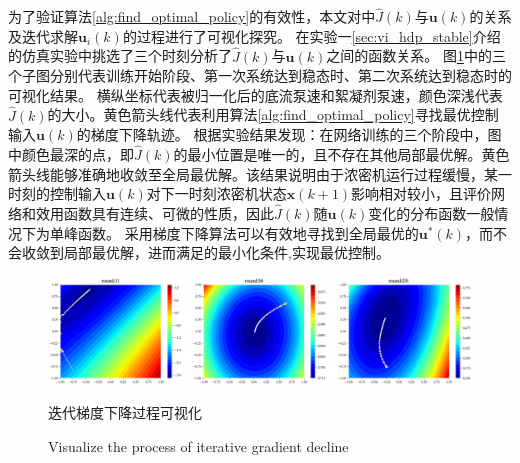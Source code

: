 为了验证算法\ref{alg:find_optimal_policy}的有效性，本文对中$\hat{J}(k)$与${\pmb
u}(k)$的关系及迭代求解$\pmb u_i(k)$的过程进行了可视化探究。
在实验一\ref{sec:vi_hdp_stable}介绍的仿真实验中挑选了三个时刻分析了$\hat{J}(k)$与${\pmb
u}(k)$之间的函数关系。
图\ref{fig:J_u_cmp}中的三个子图分别代表训练开始阶段、第一次系统达到稳态时、第二次系统达到稳态时的可视化结果。
横纵坐标代表被归一化后的底流泵速和絮凝剂泵速，颜色深浅代表$\hat{J}(k)$的大小。黄色箭头线代表利用算法\ref{alg:find_optimal_policy}寻找最优控制输入${\pmb
u}(k)$的梯度下降轨迹。
根据实验结果发现：在网络训练的三个阶段中，图中颜色最深的点，即$\hat{J}(k)$的最小位置是唯一的，且不存在其他局部最优解。黄色箭头线能够准确地收敛至全局最优解。该结果说明由于浓密机运行过程缓慢，某一时刻的控制输入${\pmb
u}(k)$对下一时刻浓密机状态$\pmb
x(k+1)$影响相对较小，且评价网络和效用函数具有连续、可微的性质，因此$\hat{J}(k)$随${\pmb
u}(k)$变化的分布函数一般情况下为单峰函数。
采用梯度下降算法可以有效地寻找到全局最优的$\pmb
u^*(k)$，而不会收敛到局部最优解，进而满足的最小化条件,实现最优控制。

\begin{figure}[!ht]
    \centering
    \includegraphics[width=18cm]{figures/chapter6/fig4.eps}
    \caption{迭代梯度下降过程可视化}
  \addtocounter{figure}{-1}
  \vspace{-5pt}
  \renewcommand{\figurename}{Fig.}
  \caption{Visualize the process of iterative gradient decline}
  \renewcommand{\figurename}{图}

\label{fig:J_u_cmp}
\end{figure}
